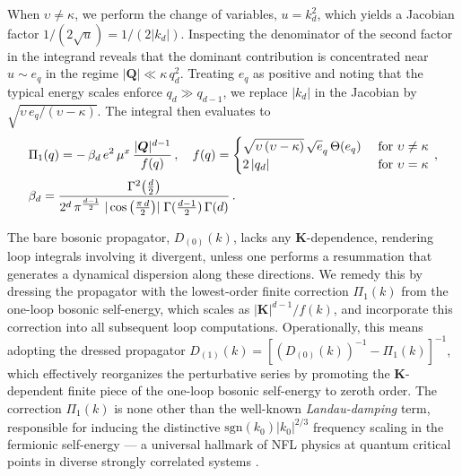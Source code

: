 When $\upsilon \neq \kappa$, we perform the change of variables, 
$u = k_d^2$, which yields a Jacobian factor $1/(2\sqrt{u}) = 1/(2|k_d|)$. 
Inspecting the denominator of the second factor in the integrand reveals 
that the dominant contribution is concentrated near $u \sim e_q$ in the 
regime $|\boldsymbol{Q}| \ll \kappa\,q_d^2$. Treating $e_q$ as positive 
and noting that the typical energy scales enforce $q_d \gg q_{d-1}$, we 
replace $|k_d|$ in the Jacobian by $\sqrt{\upsilon\,e_q/(\upsilon - \kappa)}$. 
The integral then evaluates to \cite{ips-cavity}
 \begin{align}
\label{api}
&\Pi_1 (q) = - \,\beta_d \, e^2 \, \mu^{x}  \,
 \frac{  |{\boldsymbol Q}|^{ d - 1} }
{ f(q)} \,, \quad
f(q) = \begin{cases}
\sqrt {\upsilon\,( \upsilon-\kappa) } 
 \,\sqrt e_q\, \Theta(e_q)
& \text{ for } \upsilon \neq \kappa \\
 2\,|q_d| & \text{ for } \upsilon = \kappa \\
\end{cases} \,,\nonumber \\
&\beta_d = \frac{  \Gamma^2 \big (\frac{d} {2} \big )}
{ 2^{d} \, \pi^{ \frac{d-1} {2} }\;
| \cos \big (  \frac{\pi \,d} {2} \big ) |  
\; \Gamma(\frac{d-1}{2}) \,\Gamma (d)} \,.
\end{align}


The bare bosonic propagator, $D_{(0)}(k)$, lacks any $\mathbf{K}$-dependence, 
rendering loop integrals involving it divergent, unless one 
performs a resummation that generates a dynamical dispersion along these 
directions. We remedy this by dressing the propagator with the 
lowest-order finite correction $\Pi_1(k)$ from the one-loop bosonic 
self-energy, which scales as $|\mathbf{K}|^{d-1}/f(k)$, and incorporate 
this correction into all subsequent loop computations. Operationally, 
this means adopting the dressed propagator 
$D_{(1)}(k) = \left[\left(D_{(0)}(k)\right)^{-1} - \Pi_1(k)\right]^{-1}$, 
which effectively reorganizes the perturbative series by promoting the 
$\mathbf{K}$-dependent finite piece of the one-loop bosonic self-energy 
to zeroth order. The correction $\Pi_1(k)$ is none other than the 
well-known \textit{Landau-damping} term, responsible for inducing the 
distinctive $\text{sgn}(k_0)|k_0|^{2/3}$ frequency scaling in the 
fermionic self-energy --- a universal hallmark of NFL physics at quantum 
critical points in diverse strongly correlated systems
\cite{max-isn, max-sdw, Lee-Dalid, ips-uv-ir1, ips-uv-ir2, ips-fflo, ips-u1}. 


